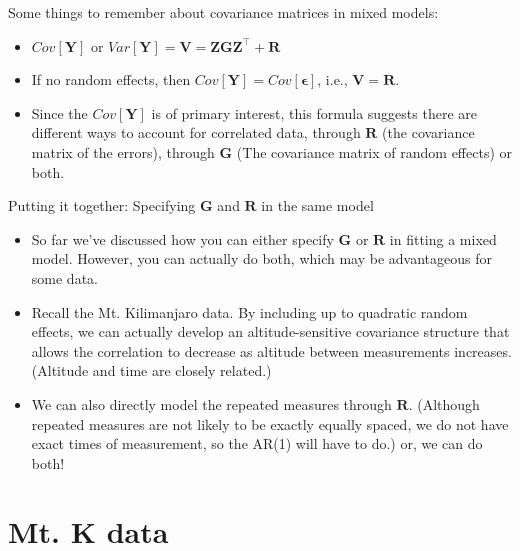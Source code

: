 \documentclass[
  9pt,
  ignorenonframetext,
]{beamer}
\begin{document}
\begin{frame}{Some things to remember about covariance matrices in mixed
models:}
\protect\hypertarget{some-things-to-remember-about-covariance-matrices-in-mixed-models}{}
\begin{itemize}
\item
  \(Cov[\pmb Y]\) or
  \(Var[\pmb Y] = \pmb V = \pmb {ZGZ}^{\top} + \pmb R\)
\item
  If no random effects, then \(Cov[\pmb Y] = Cov[\pmb \epsilon]\), i.e.,
  \(\pmb V= \pmb R\).
\item
  Since the \(Cov[\pmb Y]\) is of primary interest, this formula
  suggests there are different ways to account for correlated data,
  through \(\pmb R\) (the covariance matrix of the errors), through
  \(\pmb G\) (The covariance matrix of random effects) or both.
\end{itemize}
\end{frame}

\begin{frame}{Putting it together:}
\protect\hypertarget{putting-it-together}{}
Specifying \(\pmb G\) and \(\pmb R\) in the same model

\begin{itemize}
\item
  So far we've discussed how you can either specify \(\pmb G\) or
  \(\pmb R\) in fitting a mixed model. However, you can actually do
  both, which may be advantageous for some data.
\item
  Recall the Mt. Kilimanjaro data. By including up to quadratic random
  effects, we can actually develop an altitude-sensitive covariance
  structure that allows the correlation to decrease as altitude between
  measurements increases. (Altitude and time are closely related.)
\item
  We can also directly model the repeated measures through \(\pmb R\).
  (Although repeated measures are not likely to be exactly equally
  spaced, we do not have exact times of measurement, so the AR(1) will
  have to do.) or, we can do both!
\end{itemize}
\end{frame}

\hypertarget{mt.-k-data}{%
\section{Mt. K data}\label{mt.-k-data}}
\end{document}
